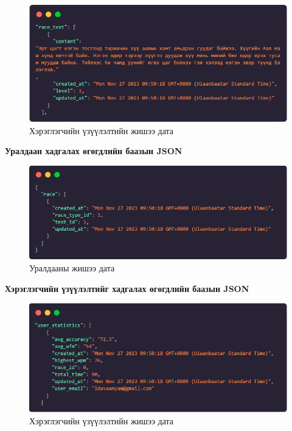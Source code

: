 \begin{figure}[h]
	\centering
	\includegraphics[width=15cm]{images/race_text_json.png}
	\caption{Хэрэглэгчийн үзүүлэлтийн жишээ дата}
	\label{fig:erd}
\end{figure}

\pagebreak

\textbf{Уралдаан хадгалах өгөгдлийн баазын JSON}

\begin{figure}[h]
	\centering
	\includegraphics[width=15cm]{images/race_json.png}
	\caption{Уралдааны жишээ дата}
	\label{fig:erd}
\end{figure}

\textbf{Хэрэглэгчийн үзүүлэлтийг хадгалах өгөгдлийн баазын JSON}

\begin{figure}[h]
	\centering
	\includegraphics[width=15cm]{images/statistics_json.png}
	\caption{Хэрэглэгчийн үзүүлэлтийн жишээ дата}
	\label{fig:erd}
\end{figure}

